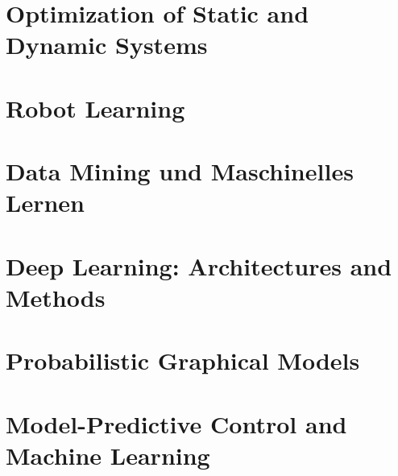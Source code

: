 \documentclass[english, notodo]{fdsummary}
\subtitle{Master of Science}
\newcommand{\lstbasepath}{unset}
\begin{document}
	\maketitle
	\tableofcontents

	\cleardoublepage
	\part{Optimization of Static and Dynamic Systems}
	\graphicspath{{./cs/cs/elective/ce/opt/}}
	\renewcommand{\lstbasepath}{./cs/elective/ce/opt}
	

	\cleardoublepage
	\part{Robot Learning}
	\graphicspath{{./cs/elective/ce/role/}}
	\renewcommand{\lstbasepath}{./cs/elective/ce/role}
	

	\cleardoublepage
	\part{Data Mining und Maschinelles Lernen}
	\graphicspath{{./cs/elective/iws/dmml/}}
	\renewcommand{\lstbasepath}{./cs/elective/iws/dmml}
	

	\cleardoublepage
	\part{Deep Learning: Architectures and Methods}
	\graphicspath{{./cs/elective/iws/dlam/}}
	\renewcommand{\lstbasepath}{./cs/elective/iws/dlam}
	

	\cleardoublepage
	\part{Probabilistic Graphical Models}
	\graphicspath{{./cs/elective/vc/pgm/}}
	\renewcommand{\lstbasepath}{./cs/elective/vc/pgm}
	

	\cleardoublepage
	\part{Model-Predictive Control and Machine Learning}
	\graphicspath{{./other/eeit/ccps/mpc/}}
	\renewcommand{\lstbasepath}{./other/eeit/ccps/mpc}
	
\end{document}
